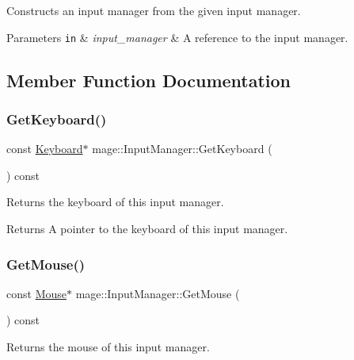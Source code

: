 Constructs an input manager from the given input manager.


\begin{DoxyParams}[1]{Parameters}
\mbox{\tt in}  & {\em input\+\_\+manager} & A reference to the input manager. \\
\hline
\end{DoxyParams}


\subsection{Member Function Documentation}
\hypertarget{classmage_1_1_input_manager_a5b72139e30d1f3da6cda50f2989c1350}{}\label{classmage_1_1_input_manager_a5b72139e30d1f3da6cda50f2989c1350} 
\subsubsection{\texorpdfstring{Get\+Keyboard()}{GetKeyboard()}}
{\footnotesize\ttfamily const \hyperlink{classmage_1_1_keyboard}{Keyboard}$\ast$ mage\+::\+Input\+Manager\+::\+Get\+Keyboard (\begin{DoxyParamCaption}{ }\end{DoxyParamCaption}) const}

Returns the keyboard of this input manager.

\begin{DoxyReturn}{Returns}
A pointer to the keyboard of this input manager. 
\end{DoxyReturn}
\hypertarget{classmage_1_1_input_manager_ad268916e07f44e40bf267efa0e673186}{}\label{classmage_1_1_input_manager_ad268916e07f44e40bf267efa0e673186} 
\subsubsection{\texorpdfstring{Get\+Mouse()}{GetMouse()}}
{\footnotesize\ttfamily const \hyperlink{classmage_1_1_mouse}{Mouse}$\ast$ mage\+::\+Input\+Manager\+::\+Get\+Mouse (\begin{DoxyParamCaption}{ }\end{DoxyParamCaption}) const}

Returns the mouse of this input manager.

